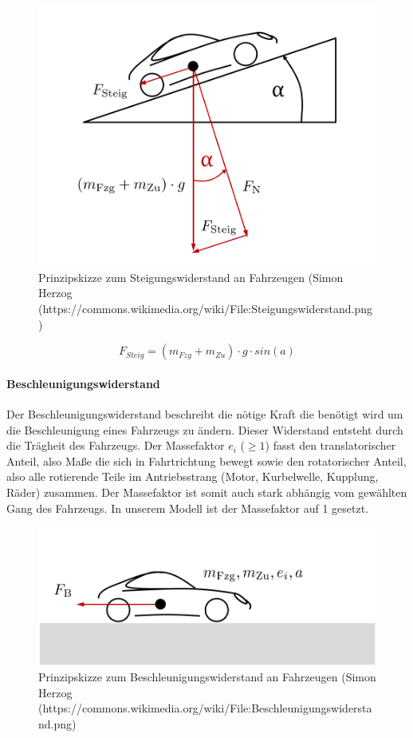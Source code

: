 \documentclass[12pt,a4paper,bibliography=totocnumbered,listof=totocnumbered, abstracton]{scrartcl}
\theoremstyle{Umgebung}
\begin{document}
\begin{figure}
	\centering
	\includegraphics[width=0.7\linewidth]{img/practical/Steigungswiderstand}
	\caption{Prinzipskizze zum Steigungswiderstand an Fahrzeugen (Simon Herzog (https://commons.wikimedia.org/wiki/File:Steigungswiderstand.png)}
	\label{fig:Steigungswiderstand}
\end{figure}

\begin{equation}
F_{Steig} = (m_{Fzg} + m_{Zu}) \cdot g \cdot sin(a)
\end{equation}

\paragraph{Beschleunigungswiderstand}

Der Beschleunigungswiderstand beschreibt die nötige Kraft die benötigt wird um die Beschleunigung eines Fahrzeugs zu ändern. Dieser Widerstand entsteht durch die Trägheit des Fahrzeugs. Der Massefaktor $e_i$ ($\ge 1$) fasst den translatorischer Anteil, also Maße die sich in Fahrtrichtung bewegt sowie den rotatorischer Anteil, also alle rotierende Teile im Antriebsstrang (Motor, Kurbelwelle, Kupplung, Räder) zusammen. Der Massefaktor ist somit auch stark abhängig vom gewählten Gang des Fahrzeugs. In unserem Modell ist der Massefaktor auf 1 gesetzt.

\begin{figure}
	\centering
	\includegraphics[width=0.7\linewidth]{img/practical/Beschleunigungswiderstand}
	\caption{Prinzipskizze zum Beschleunigungswiderstand an Fahrzeugen (Simon Herzog (https://commons.wikimedia.org/wiki/File:Beschleunigungswiderstand.png)}
	\label{fig:Beschleunigungswiderstand}
\end{figure}
\end{document}
